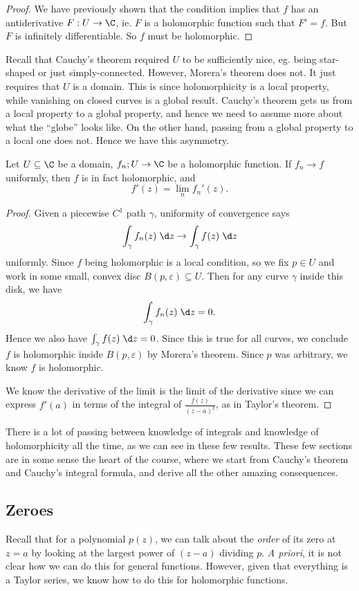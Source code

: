 \documentclass[a4paper]{article}
\begin{document}
\begin{proof}
  We have previously shown that the condition implies that $f$ has an antiderivative $F: U \to \C$, ie. $F$ is a holomorphic function such that $F' = f$. But $F$ is infinitely differentiable. So $f$ must be holomorphic.
\end{proof}

Recall that Cauchy's theorem required $U$ to be sufficiently nice, eg. being star-shaped or just simply-connected. However, Morera's theorem does not. It just requires that $U$ is a domain. This is since holomorphicity is a local property, while vanishing on closed curves is a global result. Cauchy's theorem gets us from a local property to a global property, and hence we need to assume more about what the ``globe'' looks like. On the other hand, passing from a global property to a local one does not. Hence we have this asymmetry.

\begin{cor}
  Let $U \subseteq \C$ be a domain, $f_n; U \to \C$ be a holomorphic function. If $f_n \to f$ uniformly, then $f$ is in fact holomorphic, and
  \[
    f'(z) = \lim_n f_n'(z).
  \]
\end{cor}
\begin{proof}
  Given a piecewise $C^1$ path $\gamma$, uniformity of convergence says
  \[
    \int_\gamma f_n(z)\;\d z \to \int_\gamma f(z)\;\d z
  \]
  uniformly. Since $f$ being holomorphic is a local condition, so we fix $p \in U$ and work in some small, convex disc $B(p, \varepsilon) \subseteq U$. Then for any curve $\gamma$ inside this disk, we have
  \[
    \int_\gamma f_n(z) \;\d z = 0.
  \]
  Hence we also have $\int_\gamma f(z)\;\d z = 0$. Since this is true for all curves, we conclude $f$ is holomorphic inside $B(p, \varepsilon)$ by Morera's theorem. Since $p$ was arbitrary, we know $f$ is holomorphic.

  We know the derivative of the limit is the limit of the derivative since we can express $f'(a)$ in terms of the integral of $\frac{f(z)}{(z - a)^2}$, as in Taylor's theorem.
\end{proof}
There is a lot of passing between knowledge of integrals and knowledge of holomorphicity all the time, as we can see in these few results. These few sections are in some sense the heart of the course, where we start from Cauchy's theorem and Cauchy's integral formula, and derive all the other amazing consequences.

\subsection{Zeroes}
Recall that for a polynomial $p(z)$, we can talk about the \emph{order} of its zero at $z = a$ by looking at the largest power of $(z - a)$ dividing $p$. \emph{A priori}, it is not clear how we can do this for general functions. However, given that everything is a Taylor series, we know how to do this for holomorphic functions.
\end{document}
